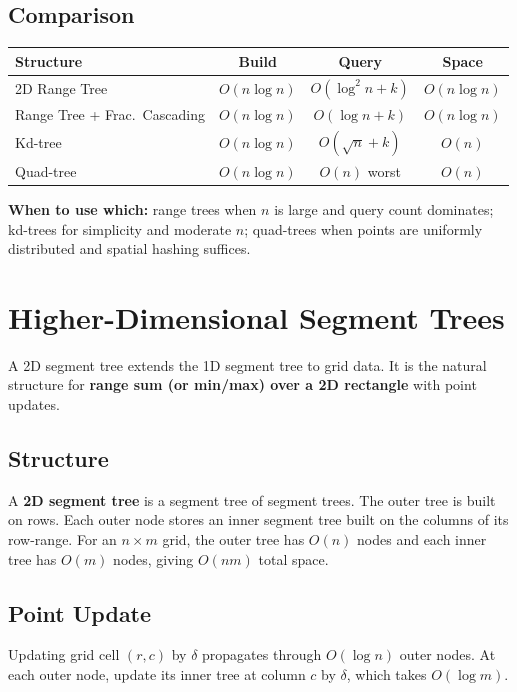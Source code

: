 \subsection{Comparison}
\label{sec:range-tree-comparison}

\begin{center}
\begin{tabular}{lccc}
\toprule
Structure & Build & Query & Space \\
\midrule
2D Range Tree & $O(n \log n)$ & $O(\log^2 n + k)$ & $O(n \log n)$ \\
Range Tree + Frac.\ Cascading & $O(n \log n)$ & $O(\log n + k)$ & $O(n \log n)$ \\
Kd-tree & $O(n \log n)$ & $O(\sqrt{n} + k)$ & $O(n)$ \\
Quad-tree & $O(n \log n)$ & $O(n)$ worst & $O(n)$ \\
\bottomrule
\end{tabular}
\end{center}

\textbf{When to use which:} range trees when $n$ is large and query count dominates; kd-trees for simplicity and moderate $n$; quad-trees when points are uniformly distributed and spatial hashing suffices.

\section{Higher-Dimensional Segment Trees}
\label{sec:2d-segment-tree}

A 2D segment tree extends the 1D segment tree to grid data. It is the natural structure for \textbf{range sum (or min/max) over a 2D rectangle} with point updates.

\subsection{Structure}

A \textbf{2D segment tree} is a segment tree of segment trees. The outer tree is built on rows. Each outer node stores an inner segment tree built on the columns of its row-range. For an $n \times m$ grid, the outer tree has $O(n)$ nodes and each inner tree has $O(m)$ nodes, giving $O(nm)$ total space.

\subsection{Point Update}

Updating grid cell $(r, c)$ by $\delta$ propagates through $O(\log n)$ outer nodes. At each outer node, update its inner tree at column $c$ by $\delta$, which takes $O(\log m)$.

